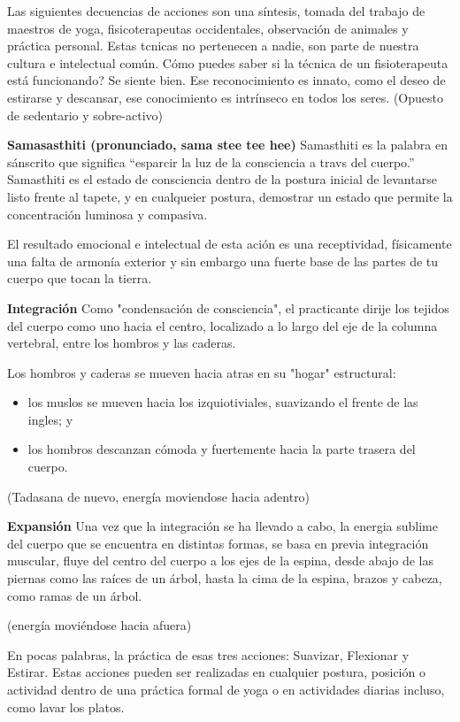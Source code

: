 Las siguientes decuencias de acciones son una síntesis, tomada del trabajo de maestros de yoga, fisicoterapeutas occidentales, observación de animales y práctica personal. Estas tcnicas no pertenecen a nadie, son parte de nuestra cultura e intelectual común. Cómo puedes saber si la t\'ecnica de un fisioterapeuta está funcionando? Se siente bien. Ese reconocimiento es innato, como el deseo de estirarse y descansar, ese conocimiento es intrínseco en todos los seres. (Opuesto de sedentario y sobre-activo)

\textbf{Samasasthiti (pronunciado, sama stee tee hee)}
Samasthiti es la palabra en sánscrito que significa ``esparcir la luz de la consciencia a travs del cuerpo.'' Samasthiti es el estado de consciencia dentro de la postura inicial de levantarse listo frente al tapete, y en cualqueier postura, demostrar un estado que permite la concentración luminosa y compasiva.

El resultado emocional e intelectual de esta ación es una receptividad, físicamente una falta de armonía exterior y sin embargo una fuerte base de las partes de tu cuerpo que tocan la tierra.

\textbf{Integración}
Como "condensaci\'on de consciencia", el practicante dirije los tejidos del cuerpo como uno hacia el centro, localizado a lo largo del eje de la columna vertebral, entre los hombros y las caderas.

Los hombros y caderas se mueven hacia atras en su "hogar" estructural:
\begin{itemize}
	\item los muslos se mueven hacia los izquiotiviales, suavizando el frente de las ingles; y
	\item los hombros descanzan c\'omoda y fuertemente hacia la parte trasera del cuerpo.
\end{itemize}
(Tadasana de nuevo, energ\'ia moviendose hacia adentro)

\textbf{Expansi\'on}
Una vez que la integración se ha llevado a cabo, la energia sublime del cuerpo que se encuentra en distintas formas, se basa en previa integración muscular, fluye del centro del cuerpo a los ejes de la espina, desde abajo de las piernas como las raíces de un árbol, hasta la cima de la espina, brazos y cabeza, como ramas de un árbol.

(energía movi\'endose hacia afuera)

En pocas palabras, la práctica de esas tres acciones: Suavizar, Flexionar y Estirar. Estas acciones pueden ser realizadas en cualquier postura, posición o actividad dentro de una práctica formal de yoga o en actividades diarias incluso, como lavar los platos.

